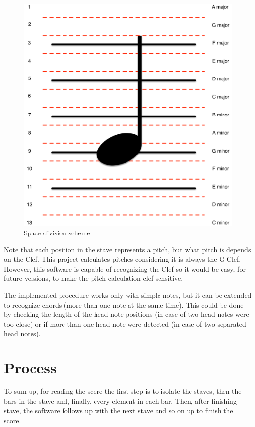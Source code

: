\documentclass[10pt, a4paper]{article}
\begin{document}
\begin{figure}[h!]
  \centering
    \includegraphics[scale=0.4]{./img/Espacio_altura.png}
  \caption{Space division scheme}
  \label{fig_pitch}
\end{figure}

Note that each position in the stave represents a pitch, but what pitch is depends on the Clef. This project calculates pitches considering it is always the G-Clef. However, this software is capable of recognizing the Clef so it would be easy,  for future versions, to make the pitch calculation clef-sensitive.

The implemented procedure works only with simple notes, but it can be extended to recognize chords (more than one note at the same time). This could be done by checking the length of the head note positions (in case of two head notes were too close) or if more than one head note were detected (in case of two separated head notes).

\section{Process}

To sum up, for reading the score the first step is to isolate the staves, then the bars in the stave and, finally, every element in each bar. Then, after finishing  stave, the software follows up with the next stave and so on up to finish the score. 
\end{document}
